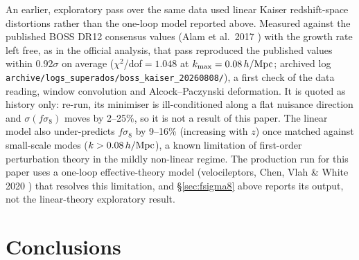 \documentclass[12pt,a4paper]{article}
\begin{document}
An earlier, exploratory pass over the same data used linear Kaiser
redshift-space distortions rather than the one-loop model reported above.
Measured against the published BOSS DR12
consensus values (Alam et al.~2017 \citep{Alam2017}) with the growth rate left free, as in the
official analysis, that pass reproduced the published values within
0.92$\sigma$ on average ($\chi^2$/dof$=1.048$ at $k_{\max}=0.08\,h/{\rm Mpc}$; archived log
\texttt{archive/logs\_superados/boss\_kaiser\_20260808/}), a first check of the data reading,
window convolution and Alcock--Paczynski deformation. It is quoted as history only: re-run,
its minimiser is ill-conditioned along a flat nuisance direction and $\sigma(f\sigma_8)$ moves
by 2--25\%, so it is not a result of this paper. The linear model also
under-predicts $f\sigma_8$ by 9--16\% (increasing with $z$) once matched
against small-scale modes ($k>0.08\,h/{\rm Mpc}$), a known limitation of
first-order perturbation theory in the mildly non-linear regime. The
production run for this paper uses a one-loop
effective-theory model (velocileptors, Chen, Vlah \& White 2020 \citep{ChenVlahWhite2020}) that
resolves this limitation, and \S\ref{sec:fsigma8} above reports its output,
not the linear-theory exploratory result.

\section{Conclusions}
\end{document}
